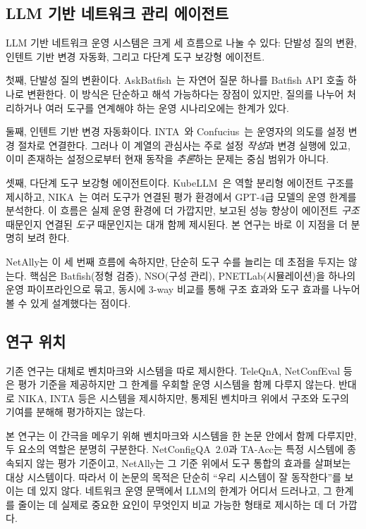 \documentclass[journal]{IEEEtran}
\begin{document}
\subsection{LLM 기반 네트워크 관리 에이전트}

LLM 기반 네트워크 운영 시스템은 크게 세 흐름으로 나눌 수 있다: 단발성 질의 변환, 인텐트 기반 변경 자동화, 그리고 다단계 도구 보강형 에이전트.

첫째, 단발성 질의 변환이다. AskBatfish~\cite{ref16}는 자연어 질문 하나를 Batfish API 호출 하나로 변환한다. 이 방식은 단순하고 해석 가능하다는 장점이 있지만, 질의를 나누어 처리하거나 여러 도구를 연계해야 하는 운영 시나리오에는 한계가 있다.

둘째, 인텐트 기반 변경 자동화이다. INTA~\cite{ref13}와 Confucius~\cite{ref15}는 운영자의 의도를 설정 변경 절차로 연결한다. 그러나 이 계열의 관심사는 주로 설정 \emph{작성}과 변경 실행에 있고, 이미 존재하는 설정으로부터 현재 동작을 \emph{추론}하는 문제는 중심 범위가 아니다.

셋째, 다단계 도구 보강형 에이전트이다. KubeLLM~\cite{ref14}은 역할 분리형 에이전트 구조를 제시하고, NIKA~\cite{ref6}는 여러 도구가 연결된 평가 환경에서 GPT-4급 모델의 운영 한계를 분석한다. 이 흐름은 실제 운영 환경에 더 가깝지만, 보고된 성능 향상이 에이전트 \emph{구조} 때문인지 연결된 \emph{도구} 때문인지는 대개 함께 제시된다. 본 연구는 바로 이 지점을 더 분명히 보려 한다.

NetAlly는 이 세 번째 흐름에 속하지만, 단순히 도구 수를 늘리는 데 초점을 두지는 않는다. 핵심은 Batfish(정형 검증), NSO(구성 관리), PNETLab(시뮬레이션)을 하나의 운영 파이프라인으로 묶고, 동시에 3-way 비교를 통해 구조 효과와 도구 효과를 나누어 볼 수 있게 설계했다는 점이다.

\subsection{연구 위치}

기존 연구는 대체로 벤치마크와 시스템을 따로 제시한다. TeleQnA, NetConfEval 등은 평가 기준을 제공하지만 그 한계를 우회할 운영 시스템을 함께 다루지 않는다. 반대로 NIKA, INTA 등은 시스템을 제시하지만, 통제된 벤치마크 위에서 구조와 도구의 기여를 분해해 평가하지는 않는다.

본 연구는 이 간극을 메우기 위해 벤치마크와 시스템을 한 논문 안에서 함께 다루지만, 두 요소의 역할은 분명히 구분한다. NetConfigQA~2.0과 TA-Acc는 특정 시스템에 종속되지 않는 평가 기준이고, NetAlly는 그 기준 위에서 도구 통합의 효과를 살펴보는 대상 시스템이다. 따라서 이 논문의 목적은 단순히 ``우리 시스템이 잘 동작한다''를 보이는 데 있지 않다. 네트워크 운영 문맥에서 LLM의 한계가 어디서 드러나고, 그 한계를 줄이는 데 실제로 중요한 요인이 무엇인지 비교 가능한 형태로 제시하는 데 더 가깝다.
\end{document}
